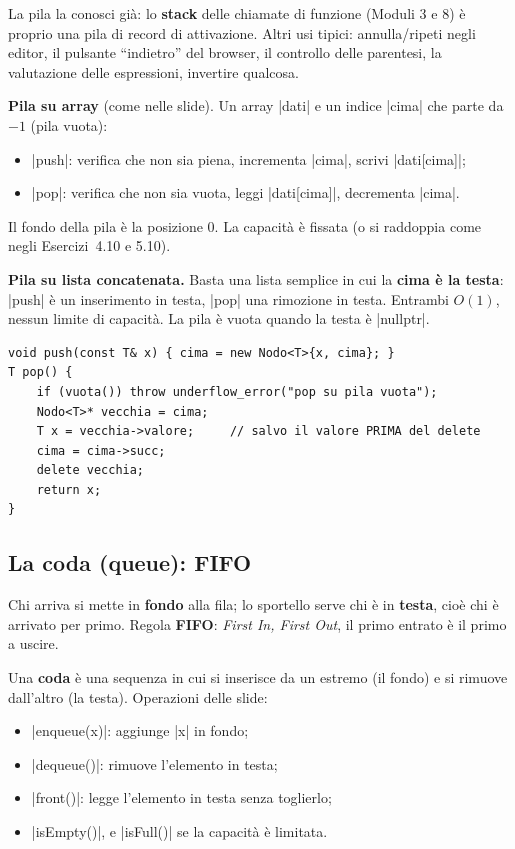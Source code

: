 La pila la conosci già: lo \textbf{stack} delle chiamate di funzione (Moduli 3 e 8) è
proprio una pila di record di attivazione. Altri usi tipici: annulla/ripeti negli
editor, il pulsante ``indietro'' del browser, il controllo delle parentesi, la
valutazione delle espressioni, invertire qualcosa.

\textbf{Pila su array} (come nelle slide). Un array \cc|dati| e un indice \cc|cima| che
parte da $-1$ (pila vuota):
\begin{itemize}
  \item \cc|push|: verifica che non sia piena, incrementa \cc|cima|, scrivi
        \cc|dati[cima]|;
  \item \cc|pop|: verifica che non sia vuota, leggi \cc|dati[cima]|, decrementa \cc|cima|.
\end{itemize}
Il fondo della pila è la posizione 0. La capacità è fissata (o si raddoppia come negli
Esercizi~4.10 e 5.10).

\textbf{Pila su lista concatenata.} Basta una lista semplice in cui la \textbf{cima è
la testa}: \cc|push| è un inserimento in testa, \cc|pop| una rimozione in testa. Entrambi
$O(1)$, nessun limite di capacità. La pila è vuota quando la testa è \cc|nullptr|.
\begin{lstlisting}
void push(const T& x) { cima = new Nodo<T>{x, cima}; }
T pop() {
    if (vuota()) throw underflow_error("pop su pila vuota");
    Nodo<T>* vecchia = cima;
    T x = vecchia->valore;     // salvo il valore PRIMA del delete
    cima = cima->succ;
    delete vecchia;
    return x;
}
\end{lstlisting}

\subsection*{La coda (queue): FIFO}

\begin{analogia}
Chi arriva si mette in \textbf{fondo} alla fila; lo sportello serve chi è in
\textbf{testa}, cioè chi è arrivato per primo. Regola \textbf{FIFO}: \emph{First In,
First Out}, il primo entrato è il primo a uscire.
\end{analogia}

\begin{definizione}[: coda]
Una \textbf{coda} è una sequenza in cui si inserisce da un estremo (il fondo) e si
rimuove dall'altro (la testa). Operazioni delle slide:
\begin{itemize}
  \item \cc|enqueue(x)|: aggiunge \cc|x| in fondo;
  \item \cc|dequeue()|: rimuove l'elemento in testa;
  \item \cc|front()|: legge l'elemento in testa senza toglierlo;
  \item \cc|isEmpty()|, e \cc|isFull()| se la capacità è limitata.
\end{itemize}
\end{definizione}

